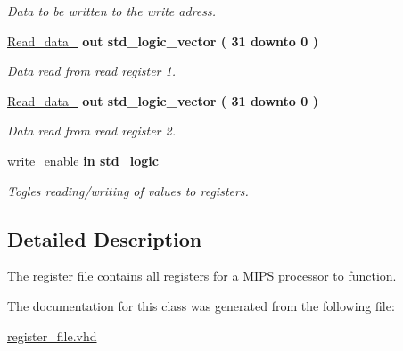 \begin{DoxyCompactItemize}
\begin{DoxyCompactList}\small\item\em \-Data to be written to the write adress. \end{DoxyCompactList}\item 
\hypertarget{classregister__file_aef4e31f5d5b779c9df8f6303cae69fb9}{\hyperlink{classregister__file_aef4e31f5d5b779c9df8f6303cae69fb9}{\-Read\-\_\-data\-\_}  {\bfseries {\bfseries out }} {\bfseries std\-\_\-logic\-\_\-vector (   31    downto    0  ) } }\label{classregister__file_aef4e31f5d5b779c9df8f6303cae69fb9}

\begin{DoxyCompactList}\small\item\em \-Data read from read register 1. \end{DoxyCompactList}\item 
\hypertarget{classregister__file_af0a7789b9c8f26a47416d35994c4a904}{\hyperlink{classregister__file_af0a7789b9c8f26a47416d35994c4a904}{\-Read\-\_\-data\-\_}  {\bfseries {\bfseries out }} {\bfseries std\-\_\-logic\-\_\-vector (   31    downto    0  ) } }\label{classregister__file_af0a7789b9c8f26a47416d35994c4a904}

\begin{DoxyCompactList}\small\item\em \-Data read from read register 2. \end{DoxyCompactList}\item 
\hypertarget{classregister__file_ad8219ae15bef1c8943970162a36feced}{\hyperlink{classregister__file_ad8219ae15bef1c8943970162a36feced}{write\-\_\-enable}  {\bfseries {\bfseries in }} {\bfseries std\-\_\-logic } }\label{classregister__file_ad8219ae15bef1c8943970162a36feced}

\begin{DoxyCompactList}\small\item\em \-Togles reading/writing of values to registers. \end{DoxyCompactList}\end{DoxyCompactItemize}


\subsection{\-Detailed \-Description}
\-The register file contains all registers for a \-M\-I\-P\-S processor to function. 

\-The documentation for this class was generated from the following file\-:\begin{DoxyCompactItemize}
\item 
\hyperlink{register__file_8vhd}{register\-\_\-file.\-vhd}\end{DoxyCompactItemize}
